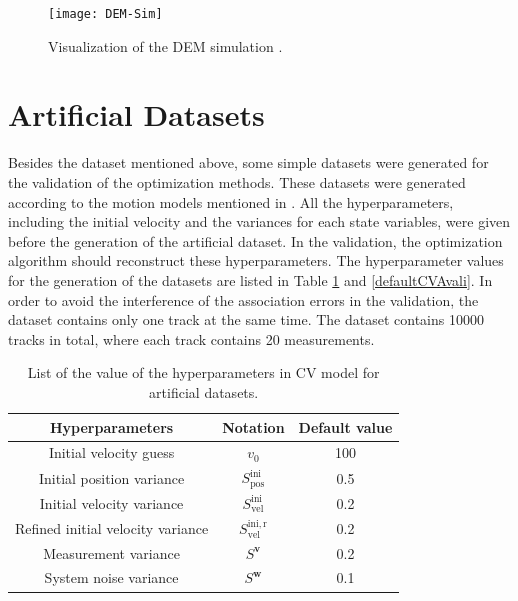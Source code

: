 \begin{figure}[htb]
    \centering
	\texttt{[image: DEM-Sim]}
	\caption{Visualization of the DEM simulation \cite{pfaff2019multitarget}.}
	\label{fig:DEMSimulation}
\end{figure}





\section{Artificial Datasets}
\label{Artificial Datasets}


Besides the dataset mentioned above, some simple datasets were generated for the validation of the optimization methods. These datasets were generated according to the motion models mentioned in . All the hyperparameters, including the initial velocity and the variances for each state variables, were given before the generation of the artificial dataset. In the validation, the optimization algorithm should reconstruct these hyperparameters. The hyperparameter values for the generation of the datasets are listed in Table \ref{defaultCVvali} and \ref{defaultCVAvali}. In order to avoid the interference of the association errors in the validation, the dataset contains only one track at the same time. The dataset contains 10000 tracks in total, where each track contains 20 measurements.

\begin{table}[htbp] 
    \centering
    \caption{List of the value of the hyperparameters in CV model for artificial datasets.} 
    \begin{tabular}{ccc} 
    \toprule 
    Hyperparameters&Notation& Default value\\ 
    \midrule 
    Initial velocity guess              &$v_{0}$&100\\
    Initial position variance           &$S_{\mathrm{pos}}^{\mathrm{ini}}$&0.5\\
    Initial velocity variance           &$S_{\mathrm{vel}}^{\mathrm{ini}}$&0.2\\
    Refined initial velocity variance   &$S_{\mathrm{vel}}^{\mathrm{ini, r}}$&0.2\\
    Measurement variance                &$S^{\boldsymbol{v}}$&0.2\\
    System noise variance               &$S^{\boldsymbol{w}}$&0.1\\ 
    \bottomrule 
    \end{tabular} 
    \label{defaultCVvali}
\end{table}

